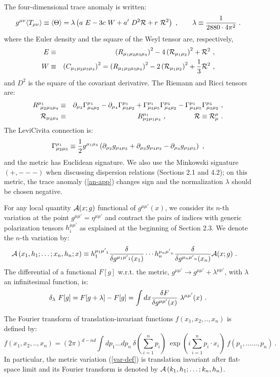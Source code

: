 \documentclass[11pt]{article}
\newcommand{\beq}{\begin{equation}}
\newcommand{\eeq}{\end{equation}}
\newcommand{\bea}{\begin{eqnarray}}
\newcommand{\eea}{\end{eqnarray}}
\def\de{\partial}
\def\l{\lambda}
\def\half{{1 \over 2}}
\def\nl{\nonumber\\}
\def\bh{\!\!\!\!\!\!}
\def\bra{\langle}
\def\ket{\rangle}
\def\mup{{\mu'}}    %
\def\gflat{{\eta}}  %
\begin{document}
The four-dimensional trace anomaly is written:
\beq
 g^{\mu\nu} \bra T_{\mu\nu} \ket \equiv 
\bra \Theta \ket = \lambda \left(
a\ E -3c\ W +a'\ D^2 {\cal R}+ r\ {\cal R}^2 \right)\ , \qquad
\lambda\equiv \frac{1}{2880\cdot 4\pi^2}\ .
\label{an-app}\eeq 
where the Euler density and the square of the Weyl tensor are,
respectively,
\bea
E&\equiv &\left( R_{\mu_1\mu_2\mu_3\mu_4}\right)^2 
 -4 \left({\cal R}_{\mu_1\mu_2}\right)^2 +{\cal R}^2\ ,
\nl
W&\equiv& \left(C_{\mu_1\mu_2\mu_3\mu_4}\right)^2 = 
\left(R_{\mu_1\mu_2\mu_3\mu_4} \right)^2 
-2\left({\cal R}_{\mu_1\mu_2} \right)^2
+{1\over 3} {\cal R}^2\ ,
\eea
and $D^2$ is the square of the covariant derivative.
The Riemann and Ricci tensors are:
\bea \label{rie} 
R^{\mu_1}_{\ \mu_2 \mu_3 \mu_4} &\equiv&
\de_{\mu_3} \Gamma^{\mu_1}_{\mu_4 \mu_2}-\de_{\mu_4} 
\Gamma^{\mu_1}_{\mu_3 \mu_2} 
+\Gamma^{\mu_1}_{\mu_3 \mu_5}\Gamma^{\mu_5}_{\mu_4 \mu_2} 
-\Gamma^{\mu_1}_{\mu_4 \mu_5}\Gamma^{\mu_5}_{\mu_3 \mu_2}\ ,
\\
\label{ricci}
{\cal R}_{\mu_2 \mu_4}&\equiv& R^{\mu_1}_{\mu_2\mu_1\mu_4}\ ,
\qquad\qquad {\cal R} \equiv {\cal R}^\mu_\mu\ .
\eea 
The LeviCivita connection is:
\beq \label{levi} 
\Gamma^{\mu_1}_{\mu_2 \mu_3}\equiv \half g^{\mu_1 \mu_4}
\left(\de_{\mu_2} g_{\mu_4 \mu_3}+\de_{\mu_3} 
g_{\mu_4 \mu_2}-\de_{\mu_4} g_{\mu_2 \mu_3} \right) \ ,
\eeq 
and the metric has Euclidean signature.
We also use the Minkowski signature $(+,---)$ when discussing 
dispersion relations (Sections 2.1 and 4.2); on this metric,
the trace anomaly (\ref{an-app}) changes sign and the normalization 
$\l$ should be chosen negative.

For any local quantity ${\cal A}(x;g)$ functional of $g^{\mu \mup}(x)$,
we consider its $n$-th variation at the point 
$g^{\mu \mup }=\gflat^{\mu \mup }$ and contract the pairs of indices
with generic polarization tensors $h_i^{\mu\mup}$ as explained at
the beginning of Section 2.3. We denote the $n$-th variation by:
\beq \label{var-def} 
\bh {\cal A}\left(x_1,h_1;\dots; x_n,h_n;x \right)
\equiv 
h_1^{\mu_1\mup_1}{\delta\over\delta g^{\mu_1\mup_1}(x_1)}
\cdots 
h_n^{\mu_n\mup_n}{\delta\over\delta g^{\mu_n\mup_n}(x_n)}
{\cal A}(x;g) \ .
\eeq
The differential of a functional $F[g]$ w.r.t. the metric, 
$g^{\mu\mup}\to g^{\mu\mup}+ \l^{\mu\mup}$, with $\l$ an infinitesimal
function, is:
\beq
\delta_\l\ F[g] = F[g+\l] -F[g]=\int dx 
{\delta F\over\delta g^{\mu\mup}(x)}\ \l^{\mu\mup}(x)\ .
\eeq

The Fourier transform of translation-invariant functions 
$f(x_1,x_2,..,x_n)$ is defined by:
\beq\label{four-def} 
f(x_1,x_2,..,x_n)=(2\pi)^{d-nd }\int dp_1...dp_n \ 
\delta\left(\sum_{i=1}^n p_i\right)\ 
\exp\left(i\sum_{i=1}^n p_i\cdot x_i\right)\   f(p_1,......,p_n) \ .
\eeq
In particular,  the metric variation
(\ref{var-def}) is translation invariant after flat-space limit 
 and its Fourier transform 
is denoted by ${\cal A}\left(k_1,h_1;\dots;k_n,h_n\right)$.
\end{document}
